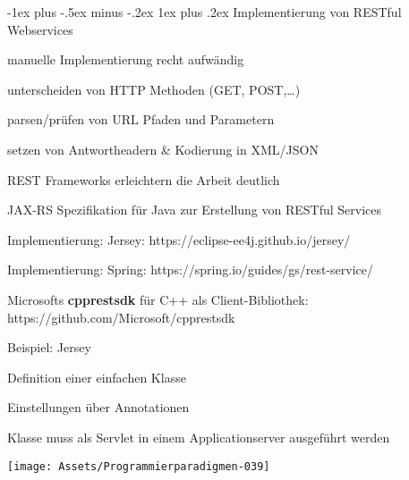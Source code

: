 \documentclass[10pt]{article}
\makeatletter
\renewcommand{\subsubsection}{\@startsection{subsubsection}{3}{0mm}%
                                {-1ex plus -.5ex minus -.2ex}%
                                {1ex plus .2ex}%
                                {\normalfont\small\bfseries}}
\makeatother
\begin{document}
\subsubsection{Implementierung von RESTful Webservices}
\begin{itemize*}
  \item manuelle Implementierung recht aufwändig
  \begin{itemize*}
    \item unterscheiden von HTTP Methoden (GET, POST,…)
    \item parsen/prüfen von URL Pfaden und Parametern
    \item setzen von Antwortheadern \& Kodierung in XML/JSON
  \end{itemize*}
  \item REST Frameworks erleichtern die Arbeit deutlich
  \begin{itemize*}
    \item JAX-RS Spezifikation für Java zur Erstellung von RESTful Services
    \begin{itemize*}
      \item Implementierung: Jersey: https://eclipse-ee4j.github.io/jersey/
      \item Implementierung: Spring:
      https://spring.io/guides/gs/rest-service/
    \end{itemize*}
    \item Microsofts \textbf{cpprestsdk} für C++ als Client-Bibliothek:
    https://github.com/Microsoft/cpprestsdk
  \end{itemize*}
\end{itemize*}
\begin{itemize*}
  \item Beispiel: Jersey
  \item Definition einer einfachen Klasse
  \begin{itemize*}
    \item Einstellungen über Annotationen
    \item Klasse muss als Servlet in einem Applicationserver ausgeführt werden
  \end{itemize*}
\end{itemize*}
\begin{center}
  \centering
  \texttt{[image: Assets/Programmierparadigmen-039]}
\end{center}
\end{document}
